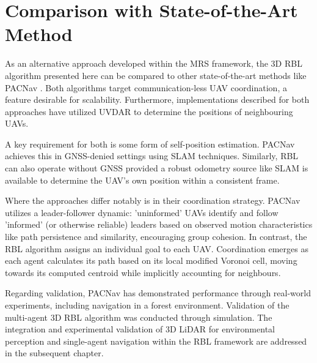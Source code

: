         

    \section{Comparison with State-of-the-Art Method}
        As an alternative approach developed within the MRS framework, the 3D \ac{RBL} algorithm presented here can be compared to other state-of-the-art methods like PACNav \cite{PACNav}.
        Both algorithms target communication-less UAV coordination, a feature desirable for scalability. 
        Furthermore, implementations described for both approaches have utilized UVDAR to determine the positions of neighbouring UAVs.

        A key requirement for both is some form of self-position estimation. 
        PACNav achieves this in GNSS-denied settings using SLAM techniques. 
        Similarly, \ac{RBL} can also operate without GNSS provided a robust odometry source like SLAM is available to determine the UAV's own position within a consistent frame.

        Where the approaches differ notably is in their coordination strategy. 
        PACNav utilizes a leader-follower dynamic: 'uninformed' UAVs identify and follow 'informed' (or otherwise reliable) leaders based on observed motion characteristics like path persistence and similarity, encouraging group cohesion. 
        In contrast, the RBL algorithm assigns an individual goal to each UAV. 
        Coordination emerges as each agent calculates its path based on its local modified Voronoi cell, moving towards its computed centroid while implicitly accounting for neighbours.

        Regarding validation, PACNav has demonstrated performance through real-world experiments, including navigation in a forest environment. 
        Validation of the multi-agent 3D RBL algorithm was conducted through simulation.
        The integration and experimental validation of 3D LiDAR for environmental perception and single-agent navigation within the RBL framework are addressed in the subsequent chapter.

